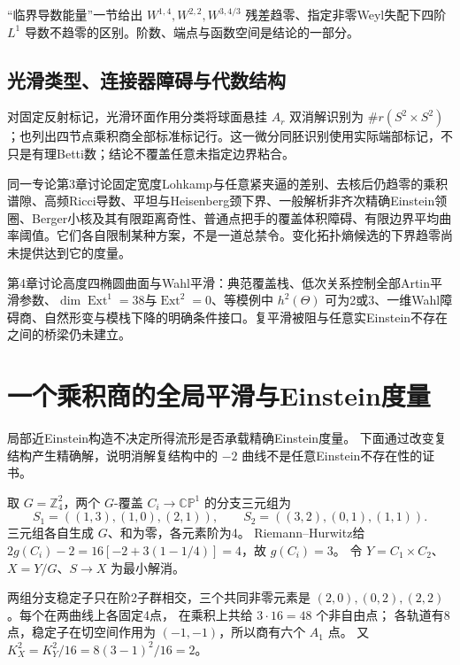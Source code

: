 \documentclass[UTF8,a4paper,11pt,fontset=fandol]{ctexart}
\numberwithin{equation}{section}
\theoremstyle{definition}
\newcommand{\CP}{\mathbb{CP}}
\newcommand{\Z}{\mathbb Z}
\begin{document}
“临界导数能量”一节给出
$W^{1,4},W^{2,2},W^{3,4/3}$ 残差趋零、指定非零Weyl失配下四阶 $L^1$ 导数不趋零的区别。阶数、端点与函数空间是结论的一部分。

\subsection{光滑类型、连接器障碍与代数结构}
对固定反射标记，光滑环面作用分类将球面悬挂 $A_r$ 双消解识别为 $\#r(S^2\times S^2)$；也列出四节点乘积商全部标准标记行。这一微分同胚识别使用实际端部标记，不只是有理Betti数；结论不覆盖任意未指定边界粘合。

同一专论第3章讨论固定宽度Lohkamp与任意紧夹逼的差别、去核后仍趋零的乘积谱隙、高频Ricci导数、平坦与Heisenberg颈下界、一般解析非齐次精确Einstein领圈、Berger小核及其有限距离奇性、普通点把手的覆盖体积障碍、有限边界平均曲率阈值。它们各自限制某种方案，不是一道总禁令。变化拓扑熵候选的下界趋零尚未提供达到它的度量。

第4章讨论高度四椭圆曲面与Wahl平滑：典范覆盖栈、低次关系控制全部Artin平滑参数、$\dim\operatorname{Ext}^1=38$与$\operatorname{Ext}^2=0$、等模例中 $h^2(\Theta)$ 可为2或3、一维Wahl障碍商、自然形变与模栈下降的明确条件接口。复平滑被阻与任意实Einstein不存在之间的桥梁仍未建立。

\section{一个乘积商的全局平滑与Einstein度量}
局部近Einstein构造不决定所得流形是否承载精确Einstein度量。
下面通过改变复结构产生精确解，说明消解复结构中的 $-2$ 曲线不是任意Einstein不存在性的证书。

取 $G=\Z_4^2$，两个 $G$-覆盖 $C_i\to\CP^1$ 的分支三元组为
\[
S_1=((1,3),(1,0),(2,1)),\qquad
S_2=((3,2),(0,1),(1,1)).
\]
三元组各自生成 $G$、和为零，各元素阶为4。
Riemann--Hurwitz给
$2g(C_i)-2=16[-2+3(1-1/4)]=4$，故 $g(C_i)=3$。
令 $Y=C_1\times C_2$、$X=Y/G$、$S\to X$ 为最小解消。

两组分支稳定子只在阶2子群相交，三个共同非零元素是
$(2,0),(0,2),(2,2)$。每个在两曲线上各固定4点，
在乘积上共给 $3\cdot16=48$ 个非自由点；
各轨道有8点，稳定子在切空间作用为 $(-1,-1)$，所以商有六个 $A_1$ 点。
又 $K_X^2=K_Y^2/16=8(3-1)^2/16=2$。
\end{document}
